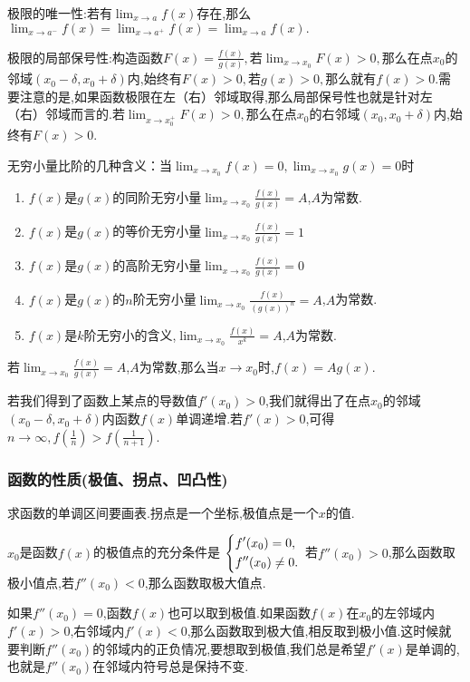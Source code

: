 极限的唯一性:若有$\lim_{x \to a}f(x)$存在,那么$\lim_{x \to a^-}f(x)=\lim_{x \to a^+}f(x)=\lim_{x \to a}f(x).$ 

极限的局部保号性:构造函数$F(x)=\frac{f(x)}{g(x)},$若$\lim_{x \to x_0}F(x)>0,$那么在点$x_0$的邻域$(x_0-\delta,x_0+\delta)$内,始终有$F(x)>0,$若$g(x)>0,$那么就有$f(x)>0.$需要注意的是,如果函数极限在左（右）邻域取得,那么局部保号性也就是针对左（右）邻域而言的.若$\lim_{x \to x_0^+}F(x)>0,$那么在点$x_0$的右邻域$(x_0,x_0+\delta)$内,始终有$F(x)>0$.

无穷小量比阶的几种含义：当$\lim_{x \to x_0} f(x)=0,\lim_{x \to x_0} g(x)=0$时
\begin{enumerate}
    \item $f(x)$是$g(x)$的同阶无穷小量$\lim_{x \to x_0} \frac{f(x)}{g(x)}=A$,$A$为常数.
    \item $f(x)$是$g(x)$的等价无穷小量$\lim_{x \to x_0} \frac{f(x)}{g(x)}=1$
    \item $f(x)$是$g(x)$的高阶无穷小量$\lim_{x \to x_0} \frac{f(x)}{g(x)}=0$
    \item $f(x)$是$g(x)$的$n$阶无穷小量$\lim_{x \to x_0} \frac{f(x)}{(g(x))^n}=A$,$A$为常数.
    \item $f(x)$是$k$阶无穷小的含义,$\lim _{x \to x_0}\frac{f(x)}{x^k}=A$,$A$为常数.
\end{enumerate}

若$\lim _{x \to x_0}\frac{f(x)}{g(x)}=A$,$A$为常数,那么当$x \to x_0$时,$f(x)=Ag(x)$.

若我们得到了函数上某点的导数值$f'(x_0)>0$,我们就得出了在点$x_0$的邻域$(x_0-\delta,x_0+\delta)$内函数$f(x)$单调递增.若$f'(x)>0$,可得$n \to \infty,f(\frac{1}{n})>f(\frac{1}{n+1})$.

\subsubsection{函数的性质(极值、拐点、凹凸性)}
求函数的单调区间要画表.拐点是一个坐标,极值点是一个$x$的值.

$x_0$是函数$f(x)$的极值点的充分条件是
$\begin{dcases}
    f'(x_0)=0,\\
    f''(x_0)\neq 0.
\end{dcases}$
若$f''(x_0)>0$,那么函数取极小值点,若$f''(x_0)<0$,那么函数取极大值点.

如果$f''(x_0)=0$,函数$f(x)$也可以取到极值.如果函数$f(x)$在$x_0$的左邻域内$f'(x)>0$,右邻域内$f'(x)<0$,那么函数取到极大值,相反取到极小值.这时候就要判断$f''(x_0)$的邻域内的正负情况,要想取到极值,我们总是希望$f'(x)$是单调的,也就是$f''(x_0)$在邻域内符号总是保持不变.

